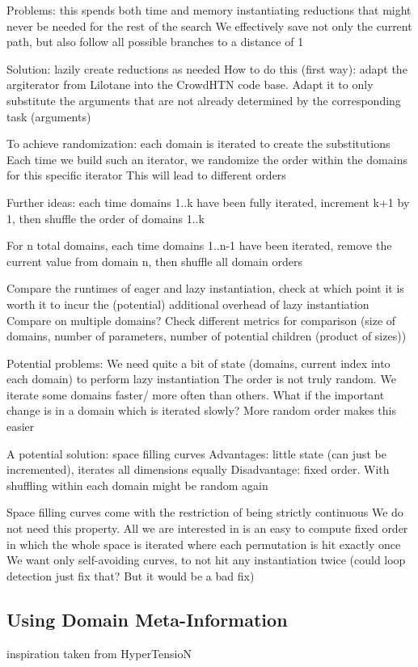 \documentclass[12pt,a4paper,twoside]{scrartcl}
\numberwithin{equation}{section}
\begin{document}
Problems: this spends both time and memory instantiating reductions that might never be needed for the rest of the search
We effectively save not only the current path, but also follow all possible branches to a distance of 1

Solution: lazily create reductions as needed
How to do this (first way):
adapt the argiterator from Lilotane into the CrowdHTN code base. Adapt it to only substitute the arguments that are not already determined by the corresponding task (arguments)

To achieve randomization:
each domain is iterated to create the substitutions
Each time we build such an iterator, we randomize the order within the domains for this specific iterator
This will lead to different orders

Further ideas:
each time domains 1..k have been fully iterated, increment k+1 by 1, then shuffle the order of domains 1..k

For n total domains, each time domains 1..n-1 have been iterated, remove the current value from domain n, then shuffle all domain orders

Compare the runtimes of eager and lazy instantiation, check at which point it is worth it to incur the (potential) additional overhead of lazy instantiation
Compare on multiple domains?
Check different metrics for comparison (size of domains, number of parameters, number of potential children (product of sizes))

Potential problems:
We need quite a bit of state (domains, current index into each domain) to perform lazy instantiation
The order is not truly random. We iterate some domains faster/ more often than others. What if the important change is in a domain which is iterated slowly? More random order makes this easier

A potential solution: space filling curves
Advantages: little state (can just be incremented), iterates all dimensions equally
Disadvantage: fixed order. With shuffling within each domain might be random again

Space filling curves come with the restriction of being strictly continuous
We do not need this property. All we are interested in is an easy to compute fixed order in which the whole space is iterated where each permutation is hit exactly once
We want only self-avoiding curves, to not hit any instantiation twice (could loop detection just fix that? But it would be a bad fix)

\subsection{Using Domain Meta-Information}
inspiration taken from HyperTensioN
\end{document}
